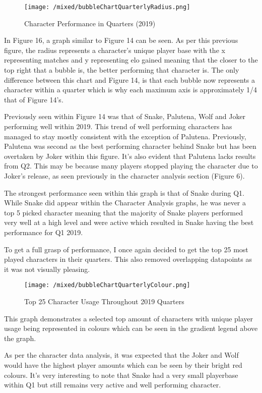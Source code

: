 \documentclass[11pt, oneside, a4paper]{article}
\begin{document}
\begin{figure}[!ht]
	\centerline{\texttt{[image: /mixed/bubbleChartQuarterlyRadius.png]}}
	\caption{Character Performance in Quarters (2019)}
	\label{fig:figure16}
\end{figure}

In Figure 16, a graph similar to Figure 14 can be seen. As per this previous figure, the radius represents a character's unique player base with the x representing matches and y representing elo gained meaning that the closer to the top right that a bubble is, the better performing that character is. The only difference between this chart and Figure 14, is that each bubble now represents a character within a quarter which is why each maximum axis is approximately 1/4 that of Figure 14's.

Previously seen within Figure 14 was that of Snake, Palutena, Wolf and Joker performing well within 2019. This trend of well performing characters has managed to stay mostly consistent with the exception of Palutena. Previously, Palutena was second as the best performing character behind Snake but has been overtaken by Joker within this figure. It's also evident that Palutena lacks results from Q2. This may be because many players stopped playing the character due to Joker's release, as seen previously in the character analysis section (Figure 6). 

The strongest performance seen within this graph is that of Snake during Q1. While Snake did appear within the Character Analysis graphs, he was never a top 5 picked character meaning that the majority of Snake players performed very well at a high level and were active which resulted in Snake having the best performance for Q1 2019.

To get a full grasp of performance, I once again decided to get the top 25 most played characters in their quarters. This also removed overlapping datapoints as it was not visually pleasing.

\begin{figure}[!ht]
	\centerline{\texttt{[image: /mixed/bubbleChartQuarterlyColour.png]}}
	\caption{Top 25 Character Usage Throughout 2019 Quarters}
	\label{fig:figure16}
\end{figure}
This graph demonstrates a selected top amount of characters with unique player usage being represented in colours which can be seen in the gradient legend above the graph.

As per the character data analysis, it was expected that the Joker and Wolf would have the highest player amounts which can be seen by their bright red colours. It's very interesting to note that Snake had a very small playerbase within Q1 but still remains very active and well performing character. 
\end{document}
